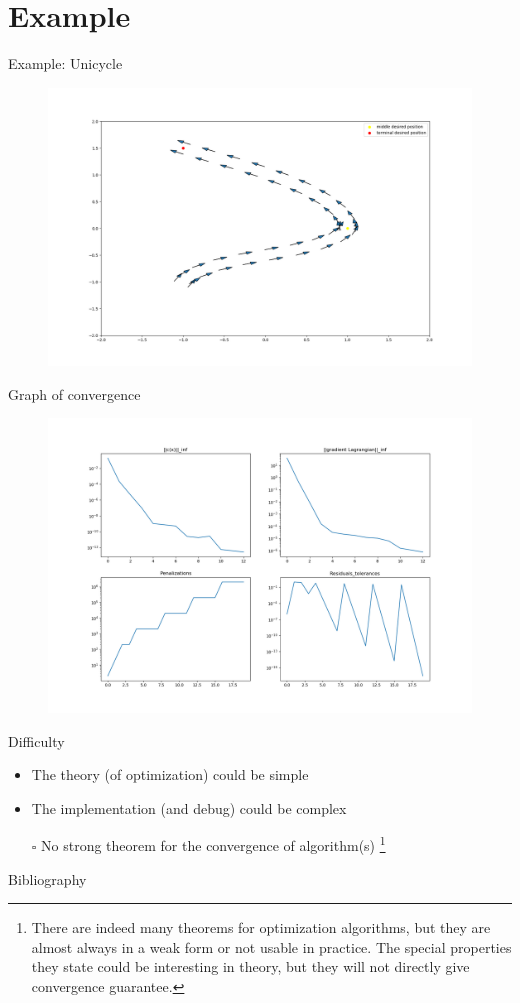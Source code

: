 \documentclass{beamer}
\begin{document}
\section{Example}
\begin{frame}{Example: Unicycle}
\begin{figure}
\includegraphics[scale=0.3]{images/Unicycle_car}
\end{figure}

\end{frame}

\begin{frame}{{Graph of convergence}}
\begin{figure}
\includegraphics[scale=0.28]{images/Unicycle}
\end{figure}
\end{frame}

\begin{frame}{Difficulty}
\begin{itemize}
\item The theory (of optimization) could be simple
\item The implementation (and debug) could be complex
\item[$\square$] No strong theorem for the convergence of algorithm(s) \footnote{There are indeed many theorems for optimization algorithms, but they are almost always in a weak form or not usable in practice. The special properties they state could be interesting in theory, but they will not directly give convergence guarantee.}
\end{itemize}
\end{frame}

\begin{frame}{Bibliography}

{}

\end{frame}
\end{document}
